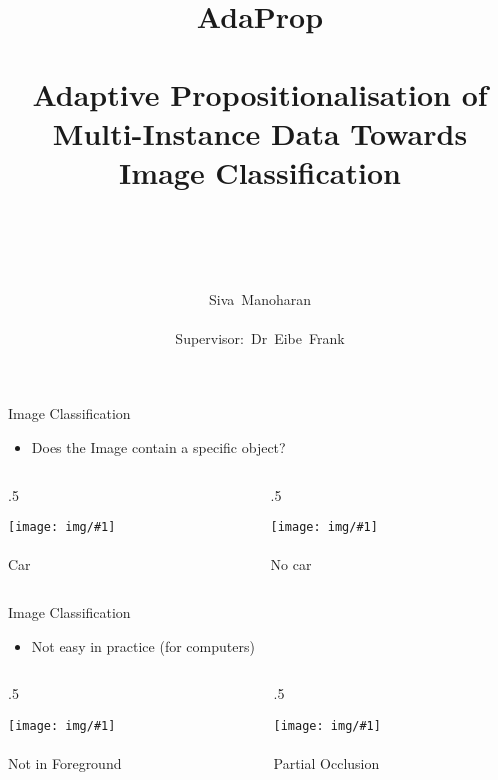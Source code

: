 \documentclass{beamer}
\title{ 
    ~\\~\\ 
    {\huge AdaProp} 
    \\~\\
    {\large Adaptive Propositionalisation of Multi-Instance Data Towards Image Classification}
    \\~
}
\author{~\\~\\Siva~Manoharan\\~\\Supervisor:~Dr~Eibe~Frank}
\date{} %
\newcommand{\ImageAndCaptionColumn}[2]{%
    \begin{column}{.5\textwidth}
        \begin{center} 
            \texttt{[image: img/\#1]} \\~\\ 
            {\Large #2}
        \end{center} 
    \end{column}
}
\newcommand{\TextAndTwoImageFrame}[5]{%
    \vspace{-0.5cm}    
    
    \begin{itemize}
        \item #1
    \end{itemize}
    
    \vspace{-0.5cm} %
    
    \begin{columns}[T]
        \ImageAndCaptionColumn{#2}{#3}
        \ImageAndCaptionColumn{#4}{#5}
    \end{columns}
}
\begin{document}
{
    \makeatletter
        \def\beamer@entrycode{\vspace*{-0.8\headheight}}
    \makeatother

    \begin{frame}
        \titlepage
    \end{frame}
}

\begin{frame}{Image Classification}

    \TextAndTwoImageFrame{
        Does the Image contain a specific object?
    }{cars1}{Car}{none1}{No car}
    
\end{frame}

\begin{frame}{Image Classification}

    \TextAndTwoImageFrame{
        Not easy in practice (for computers)
    }{cars3}{Not in Foreground}{cars2}{Partial Occlusion}
    
\end{frame}
\end{document}
